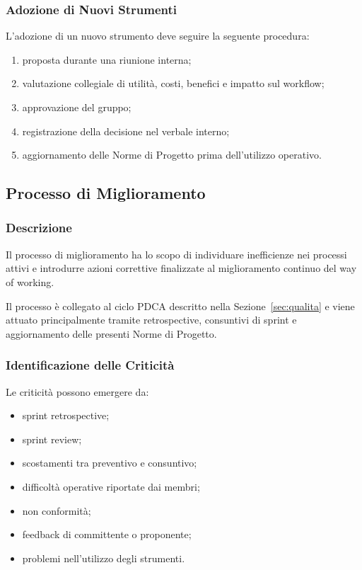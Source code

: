 \subsubsection{Adozione di Nuovi Strumenti}

L'adozione di un nuovo strumento deve seguire la seguente procedura:

\begin{enumerate}
    \item proposta durante una riunione interna;
    \item valutazione collegiale di utilità, costi, benefici e impatto sul workflow;
    \item approvazione del gruppo;
    \item registrazione della decisione nel verbale interno;
    \item aggiornamento delle Norme di Progetto prima dell'utilizzo operativo.
\end{enumerate}


\subsection{Processo di Miglioramento}
\label{sec:miglioramento}

\subsubsection{Descrizione}

Il processo di miglioramento ha lo scopo di individuare inefficienze nei processi
attivi e introdurre azioni correttive finalizzate al miglioramento continuo del
way of working.

Il processo è collegato al ciclo PDCA descritto nella Sezione~\ref{sec:qualita}
e viene attuato principalmente tramite retrospective, consuntivi di sprint e
aggiornamento delle presenti Norme di Progetto.


\subsubsection{Identificazione delle Criticità}

Le criticità possono emergere da:

\begin{itemize}
    \item sprint retrospective;
    \item sprint review;
    \item scostamenti tra preventivo e consuntivo;
    \item difficoltà operative riportate dai membri;
    \item non conformità;
    \item feedback di committente o proponente;
    \item problemi nell'utilizzo degli strumenti.
\end{itemize}

